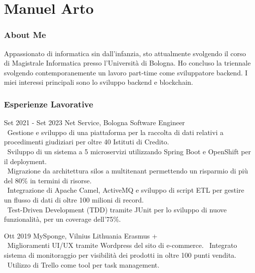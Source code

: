 \documentclass{tccv}
\begin{document}
\part{Manuel Arto}

\section{About Me}

Appassionato di informatica sin dall'infanzia, sto attualmente svolgendo il corso di Magistrale Informatica presso l'Università di Bologna. Ho concluso la triennale svolgendo contemporanemente un lavoro part-time come sviluppatore backend. I miei interessi principali sono lo sviluppo backend e blockchain.

\section{Esperienze Lavorative}

\begin{eventlist}

\item{Set 2021 - Set 2023}
     {Net Service, Bologna}
     {Software Engineer} \\
     \textbullet~Gestione e sviluppo di una piattaforma per la raccolta di dati relativi a procedimenti giudiziari per oltre 40 Istituti di Credito. \\
     \textbullet~Sviluppo di un sistema a 5 microservizi utilizzando Spring Boot e OpenShift per il deployment. \\
     \textbullet~Migrazione da architettura silos a multitenant permettendo un risparmio di più del 80\% in termini di risorse. \\
     \textbullet~Integrazione di Apache Camel, ActiveMQ e sviluppo di script ETL per gestire un flusso di dati di oltre 100 milioni di record. \\
     \textbullet~Test-Driven Development (TDD) tramite JUnit per lo sviluppo di nuove funzionalità, per un coverage dell'75\%.

\item{Ott 2019}
     {MySponge, Vilnius Lithuania}
     {Erasmus +} \\
     \textbullet~Miglioramenti UI/UX tramite Wordpress del sito di e-commerce. \newline
     \textbullet~Integrato sistema di monitoraggio per visibilità dei prodotti in oltre 100 punti vendita. \newline
     \textbullet~Utilizzo di Trello come tool per task management.

\end{eventlist}
\end{document}

